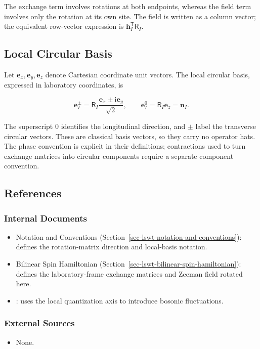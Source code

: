 The exchange term involves rotations at both endpoints, whereas the field term involves only the rotation at its own site. The field is written as a column vector; the equivalent row-vector expression is \(\mathbf h_I^{\mathsf T}\mathsf R_I\).

\subsection{Local Circular Basis}

Let \(\mathbf e_x,\mathbf e_y,\mathbf e_z\) denote Cartesian coordinate unit vectors. The local circular basis, expressed in laboratory coordinates, is

\[
\mathbf e_I^\pm
=\mathsf R_I\frac{\mathbf e_x\pm\mathrm i\mathbf e_y}{\sqrt2},
\qquad
\mathbf e_I^0=\mathsf R_I\mathbf e_z=\mathbf n_I.
\]

The superscript \(0\) identifies the longitudinal direction, and \(\pm\) label the transverse circular vectors. These are classical basis vectors, so they carry no operator hats. The phase convention is explicit in their definitions; contractions used to turn exchange matrices into circular components require a separate component convention.

\subsection{References}

\subsubsection{Internal Documents}

\begin{itemize}
\tightlist
\item
  Notation and Conventions (Section~\ref{sec-lswt-notation-and-conventions}): defines the rotation-matrix direction and local-basis notation.
\item
  Bilinear Spin Hamiltonian (Section~\ref{sec-lswt-bilinear-spin-hamiltonian}): defines the laboratory-frame exchange matrices and Zeeman field rotated here.
\item
  : uses the local quantization axis to introduce bosonic fluctuations.
\end{itemize}

\subsubsection{External Sources}

\begin{itemize}
\tightlist
\item
  None.
\end{itemize}
